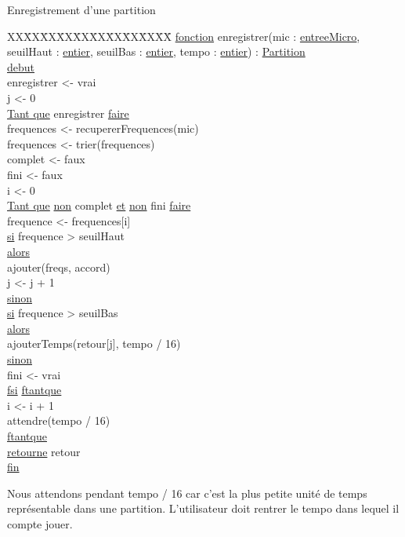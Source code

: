Enregistrement d'une partition\newline
\begin{tabbing}
\kill XX\=XX\=XX\=XX\=XX\=XX\=XX\=XX\=XX\=XX\=
\kill
\ul{fonction} enregistrer(mic : \ul{entreeMicro}, seuilHaut :  \ul{entier}, seuilBas : \ul{entier}, tempo : \ul{entier}) : \ul{Partition}\\
\ul{debut}\\
\>enregistrer <- vrai\\
\>j <- 0\\
\>\ul{Tant que} enregistrer \ul{faire}\\
    \>\>frequences <- recupererFrequences(mic)\\
    \>\>frequences <- trier(frequences)\\
    \>\>complet <- faux\\
    \>\>fini <- faux\\
    \>\>i <- 0 \\
    \>\>\ul{Tant que} \ul{non} complet \ul{et} \ul{non} fini \ul{faire}\\
        \>\>\>frequence <- frequences[i]\\
        \>\>\>\ul{si} frequence > seuilHaut\\
        \>\>\>\ul{alors}\\
            \>\>\>\>ajouter(freqs, accord)\\
            \>\>\>\>j <- j + 1\\
        \>\>\>\ul{sinon}\\
            \>\>\>\>\ul{si} frequence > seuilBas\\
            \>\>\>\>\ul{alors}\\ 
                \>\>\>\>\>ajouterTemps(retour[j], tempo / 16)\\
            \>\>\>\>\ul{sinon}\\
                \>\>\>\>\>fini <- vrai\\
        \>\>\>\ul{fsi}
    \>\>\ul{ftantque}\\     
    \>\>i <- i + 1\\  
    \>\>attendre(tempo / 16)\\
\>\ul{ftantque}\\
\>\ul{retourne} retour \\
\ul{fin}\\
\end{tabbing}

Nous attendons pendant tempo / 16 car c'est la plus petite unité de temps représentable dans une partition. L'utilisateur doit rentrer le tempo dans lequel il compte jouer.


